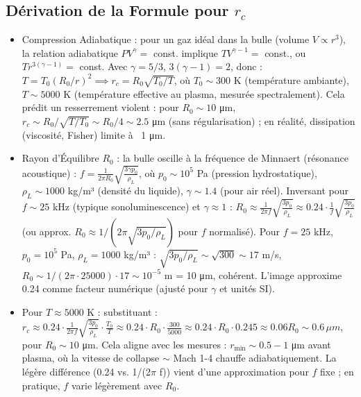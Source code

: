 \documentclass[a4paper,12pt]{article}
\begin{document}
\subsection{Dérivation de la Formule pour \( r_c \)}
\begin{itemize}
    \item Compression Adiabatique : pour un gaz idéal dans la bulle (volume \( V \propto r^3 \)), la relation adiabatique \( P V^\gamma = \) const. implique \( T V^{\gamma - 1} = \) const., ou \( T r^{3(\gamma - 1)} = \) const. Avec \(\gamma = 5/3\), \( 3(\gamma - 1) = 2 \), donc : \( T = T_0 (R_0 / r)^2 \implies r_c = R_0 \sqrt{T_0 / T} \), où \( T_0 \sim 300 \) K (température ambiante), \( T \sim 5000 \) K (température effective au plasma, mesurée spectralement). Cela prédit un resserrement violent : pour \( R_0 \sim 10 \) μm, \( r_c \sim R_0 / \sqrt{T / T_0} \sim R_0 / 4 \sim 2.5 \) μm (sans régularisation) ; en réalité, dissipation (viscosité, Fisher) limite à ~1 μm.
    \item Rayon d'Équilibre \( R_0 \) : la bulle oscille à la fréquence de Minnaert (résonance acoustique) : \( f = \frac{1}{2 \pi R_0} \sqrt{\frac{3 \gamma p_0}{\rho_L}} \), où \( p_0 \sim 10^5 \) Pa (pression hydrostatique), \( \rho_L \sim 1000 \) kg/m³ (densité du liquide), \(\gamma \sim 1.4\) (pour air réel). Inversant pour \( f \sim 25 \) kHz (typique sonoluminescence) et \(\gamma \approx 1\) : \( R_0 \approx \frac{1}{2 \pi f} \sqrt{\frac{3 p_0}{\rho_L}} \approx 0.24 \cdot \frac{1}{f} \sqrt{\frac{3 p_0}{\rho_L}} \) (ou approx. \( R_0 \approx 1/(2 \pi \sqrt{3 p_0 / \rho_L}) \) pour \( f \) normalisé). Pour \( f = 25 \) kHz, \( p_0 = 10^5 \) Pa, \( \rho_L = 1000 \) kg/m³ : \(\sqrt{3 p_0 / \rho_L} \sim \sqrt{300} \sim 17\) m/s, \( R_0 \sim 1/(2 \pi \cdot 25000) \cdot 17 \sim 10^{-5} \) m = 10 μm, cohérent. L'image approxime 0.24 comme facteur numérique (ajusté pour \(\gamma\) et unités SI).
    \item Pour \( T \approx 5000 \) K : substituant : \( r_c \approx 0.24 \cdot \frac{1}{2 \pi f} \sqrt{\frac{3 p_0}{\rho_L}} \cdot \frac{T_0}{T} \approx 0.24 \cdot R_0 \cdot \frac{300}{5000} \approx 0.24 \cdot R_0 \cdot 0.245 \approx 0.06 R_0 \sim 0.6 \, \mu m \), pour \( R_0 \sim 10 \) μm. Cela aligne avec les mesures : \( r_{\text{min}} \sim 0.5 - 1 \) μm avant plasma, où la vitesse de collapse \(\sim\) Mach 1-4 chauffe adiabatiquement. La légère différence (0.24 vs. 1/(2\(\pi\) f)) vient d'une approximation pour \( f \) fixe ; en pratique, \( f \) varie légèrement avec \( R_0 \).
\end{itemize}
\end{document}

